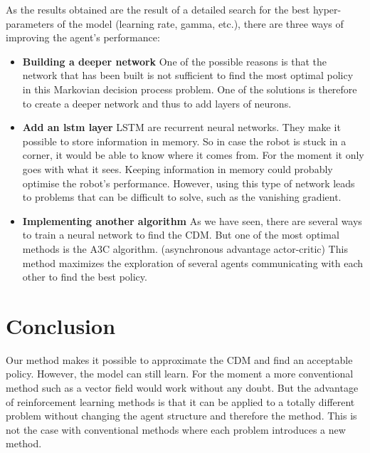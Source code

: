 As the results obtained are the result of a detailed search for the best hyper-parameters of the model (learning rate, gamma, etc.), there are three ways of improving the agent's performance:
\begin{itemize}
    \item \textbf{Building a deeper network}
    One of the possible reasons is that the network that has been built is not sufficient to find the most optimal policy in this Markovian decision process problem.
    One of the solutions is therefore to create a deeper network and thus to add layers of neurons.
    \item \textbf{Add an lstm layer} 
    LSTM \cite{LSTM} are recurrent neural networks. They make it possible to store information in memory. So in case the robot is stuck in a corner, it would be able to know where it comes from. For the moment it only goes with what it sees. Keeping information in memory could probably optimise the robot's performance.
    However, using this type of network leads to problems that can be difficult to solve, such as the vanishing gradient.\cite{vanishing}
    \item \textbf{Implementing another algorithm}
    As we have seen, there are several ways to train a neural network to find the CDM.
    But one of the most optimal methods is the A3C \cite{A3C} algorithm. (asynchronous  advantage  actor-critic)
    This method maximizes the exploration of several agents communicating with each other to find the best policy.
\end{itemize}


\section*{Conclusion}
Our method makes it possible to approximate the CDM and find an acceptable policy. However, the model can still learn. For the moment a more conventional method such as a vector field would work without any doubt.
But the advantage of reinforcement learning methods is that it can be applied to a totally different problem without changing the agent structure and therefore the method.
This is not the case with conventional methods where each problem introduces a new method.

